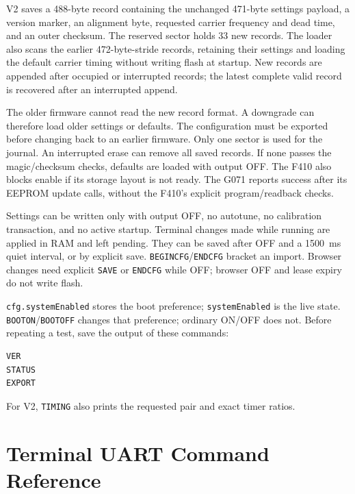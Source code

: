 V2 saves a 488-byte record containing the unchanged 471-byte settings payload, a version marker, an alignment byte, requested carrier frequency and dead time, and an outer checksum. The reserved sector holds 33 new records. The loader also scans the earlier 472-byte-stride records, retaining their settings and loading the default carrier timing without writing flash at startup. New records are appended after occupied or interrupted records; the latest complete valid record is recovered after an interrupted append.

The older firmware cannot read the new record format. A downgrade can therefore load older settings or defaults. The configuration must be exported before changing back to an earlier firmware.
Only one sector is used for the journal. An interrupted erase can remove all saved records. If none passes the magic/checksum checks, defaults are loaded with output OFF. The F410 also blocks enable if its storage layout is not ready. The G071 reports success after its EEPROM update calls, without the F410's explicit program/readback checks.

Settings can be written only with output OFF, no autotune, no calibration transaction, and no active startup. Terminal changes made while running are applied in RAM and left pending. They can be saved after OFF and a \SI{1500}{\milli\second} quiet interval, or by explicit save. \texttt{BEGINCFG}/\texttt{ENDCFG} bracket an import. Browser changes need explicit \texttt{SAVE} or \texttt{ENDCFG} while OFF; browser OFF and lease expiry do not write flash.

\texttt{cfg.systemEnabled} stores the boot preference; \texttt{systemEnabled} is the live state. \texttt{BOOTON}/\texttt{BOOTOFF} changes that preference; ordinary ON/OFF does not. Before repeating a test, save the output of these commands:
\begin{lstlisting}[basicstyle=\ttfamily\small,caption={Commands to print the firmware version, status, and settings.},label={lst:app-fw-identity}]
VER
STATUS
EXPORT
\end{lstlisting}
For V2, \texttt{TIMING} also prints the requested pair and exact timer ratios.

\section{Terminal UART Command Reference}
\label{sec:app-fw-terminal}

